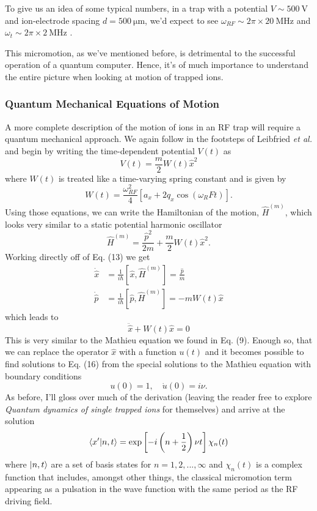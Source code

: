 To give us an idea of some typical numbers, in a trap with a potential $V \sim \SI{500}{\volt}$ and ion-electrode spacing $d = \SI{500}{\micro\meter}$, we'd expect to see $\omega_{RF} \sim 2\pi \times \SI{20}{\mega\hertz}$ and $\omega_t \sim 2\pi \times \SI{2}{\mega\hertz}$ \cite{Brownnutt}.

This micromotion, as we've mentioned before, is detrimental to the successful operation of a quantum computer. Hence, it's of much importance to understand the entire picture when looking at motion of trapped ions.
\subsubsection{Quantum Mechanical Equations of Motion}
A more complete description of the motion of ions in an RF trap will require a quantum mechanical approach. We again follow in the footsteps of Leibfried \textit{et al.} and begin by writing the time-dependent potential $V(t)$ as
\begin{equation}
    V(t) = \frac{m}{2} W(t) \hat{x}^2
\end{equation}
where $W(t)$ is treated like a time-varying spring constant and is given by
\begin{equation}
    W(t) = \frac{\omega_{RF}^2}{4} [a_x + 2q_x \cos(\omega_RF t)].
\end{equation}
Using those equations, we can write the Hamiltonian of the motion, $\hat{H}^{(m)}$, which looks very similar to a static potential harmonic oscillator
\begin{equation}
    \hat{H}^{(m)} = \frac{\hat{p}^2}{2m} + \frac{m}{2} W(t) \hat{x}^2.
\end{equation}
Working directly off of Eq. (13) we get
\begin{align}
    \dot{\hat{x}} &= \frac{1}{i\hbar} [\hat{x}, \hat{H}^{(m)}] = \frac{\hat{p}}{m}\\
    \dot{\hat{p}} &= \frac{1}{i\hbar} [\hat{p}, \hat{H}^{(m)}] = -m W(t) \hat{x}
\end{align}
which leads to
\begin{equation}
    \ddot{\hat{x}} + W(t) \hat{x} = 0
\end{equation}
This is very similar to the Mathieu equation we found in Eq. (9). Enough so, that we can replace the operator $\hat{x}$ with a function $u(t)$ and it becomes possible to find solutions to Eq. (16) from the special solutions to the Mathieu equation with boundary conditions
\begin{equation}
    u(0) = 1, \quad \dot{u}(0) = i\nu.
\end{equation}
As before, I'll gloss over much of the derivation (leaving the reader free to explore \textit{Quantum dynamics of single trapped ions} for themselves) \cite{Leibfried} and arrive at the solution
\begin{equation}
    \braket{x'}{n, t} = \exp \left[ -i \left(n + \frac{1}{2} \right) \nu t \right] \chi_n (t)    
\end{equation}
where $\ket{n, t}$ are a set of basis states for $n = 1, 2, ..., \infty$ and $\chi_n(t)$ is a complex function that includes, amongst other things, the classical micromotion term appearing as a pulsation in the wave function with the same period as the RF driving field.

